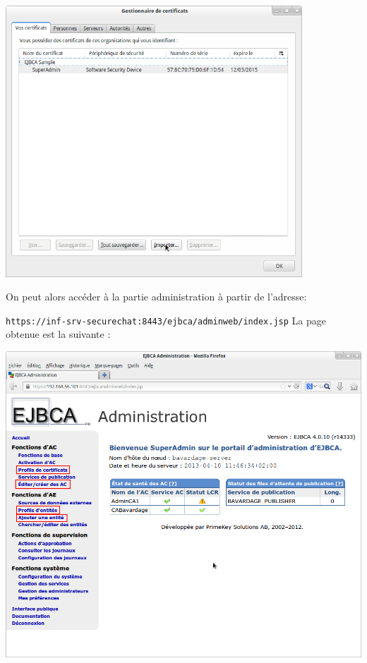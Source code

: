 \documentclass[a4paper,11pt,french]{book}
\begin{document}
\begin{center}
\includegraphics[width=30em]{import_superadmin.png}
\end{center}

On peut alors accéder à la partie administration à partir de l'adresse:

\verb+https://inf-srv-securechat:8443/ejbca/adminweb/index.jsp+
\newpage
La page obtenue est la suivante :
\begin{center}
\includegraphics[width=40em]{admin_ejbca.png}
\end{center}
\end{document}
